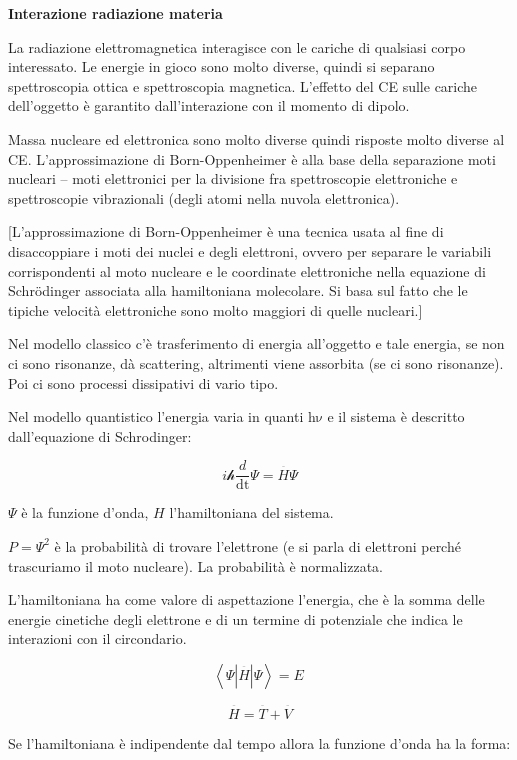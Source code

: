 \textbf{Interazione radiazione materia}

La radiazione elettromagnetica interagisce con le cariche di qualsiasi
corpo interessato. Le energie in gioco sono molto diverse, quindi si
separano spettroscopia ottica e spettroscopia magnetica. L'effetto del
CE sulle cariche dell'oggetto è garantito dall'interazione con il
momento di dipolo.

Massa nucleare ed elettronica sono molto diverse quindi risposte molto
diverse al CE. L'approssimazione di Born-Oppenheimer è alla base della
separazione moti nucleari -- moti elettronici per la divisione fra
spettroscopie elettroniche e spettroscopie vibrazionali (degli atomi
nella nuvola elettronica).

{[}L'approssimazione di Born-Oppenheimer è una tecnica usata al fine di
disaccoppiare i moti dei nuclei e degli elettroni, ovvero per separare
le variabili corrispondenti al moto nucleare e le coordinate
elettroniche nella equazione di Schrödinger associata alla hamiltoniana
molecolare. Si basa sul fatto che le tipiche velocità elettroniche sono
molto maggiori di quelle nucleari.{]}

Nel modello classico c'è trasferimento di energia all'oggetto e tale
energia, se non ci sono risonanze, dà scattering, altrimenti viene
assorbita (se ci sono risonanze). Poi ci sono processi dissipativi di
vario tipo.

Nel modello quantistico l'energia varia in quanti \(\text{hν}\) e il
sistema è descritto dall'equazione di Schrodinger:

\[i\mathcal{h}\frac{d}{\text{dt}}\Psi = \overset{\overline{}}{H}\Psi\]

\(\Psi\) è la funzione d'onda, \(H\) l'hamiltoniana del sistema.

\(P = \Psi^{2}\) è la probabilità di trovare l'elettrone (e si parla di
elettroni perché trascuriamo il moto nucleare). La probabilità è
normalizzata.

L'hamiltoniana ha come valore di aspettazione l'energia, che è la somma
delle energie cinetiche degli elettrone e di un termine di potenziale
che indica le interazioni con il circondario.

\[\left\langle \Psi\left| \overset{\overline{}}{H} \right|\Psi \right\rangle = E\ \]

\[\overset{\overline{}}{H} = \overset{\overline{}}{T} + \overset{\overline{}}{V}\]

Se l'hamiltoniana è indipendente dal tempo allora la funzione d'onda ha
la forma:

